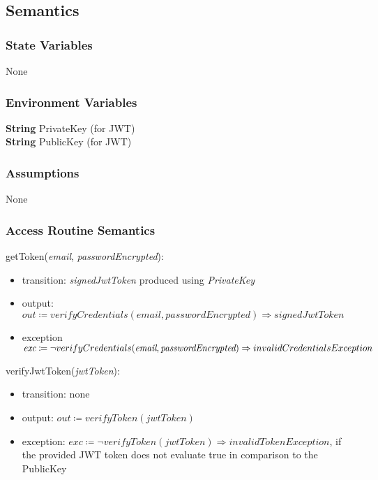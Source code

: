 \documentclass[12pt, titlepage]{article}
\begin{document}
\subsection{Semantics}

\subsubsection{State Variables}
None

\subsubsection{Environment Variables}
\textbf{String} PrivateKey (for JWT) \\
\textbf{String} PublicKey (for JWT)

\subsubsection{Assumptions}
None

\subsubsection{Access Routine Semantics}

\noindent getToken(\textit{email}, \textit{passwordEncrypted}):
\begin{itemize}
\item transition: \textit{signedJwtToken} produced using \textit{PrivateKey}
\item output: \( \textit{out} \coloneqq verifyCredentials(\textit{email}, \textit{passwordEncrypted}) \Rightarrow  signedJwtToken\) 
\item exception \( \textit{exc} \coloneqq \neg verifyCredentials(\textit{email}, \textit{passwordEncrypted}) \Rightarrow \\ invalidCredentialsException\)
\end{itemize}

\noindent verifyJwtToken(\textit{jwtToken}):
\begin{itemize}
\item transition: none
\item output: \( \textit{out} \coloneqq verifyToken(\textit{jwtToken})\)
\item exception: \( \textit{exc} \coloneqq \neg verifyToken(\textit{jwtToken}) \Rightarrow invalidTokenException \), if the provided JWT token does not evaluate true in comparison to the PublicKey
\end{itemize}
\end{document}
